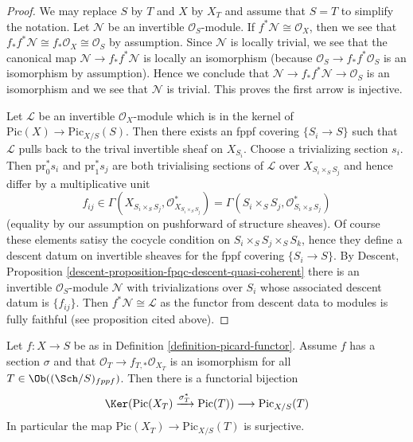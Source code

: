 \begin{proof}
We may replace $S$ by $T$ and $X$ by $X_T$ and assume that $S = T$
to simplify the notation. Let $\mathcal{N}$ be an invertible
$\mathcal{O}_S$-module. If $f^*\mathcal{N} \cong \mathcal{O}_X$, then
we see that $f_*f^*\mathcal{N} \cong f_*\mathcal{O}_X \cong \mathcal{O}_S$
by assumption. Since $\mathcal{N}$ is locally trivial, we see that
the canonical map $\mathcal{N} \to f_*f^*\mathcal{N}$ is locally
an isomorphism (because $\mathcal{O}_S \to f_*f^*\mathcal{O}_S$
is an isomorphism by assumption). Hence we conclude that
$\mathcal{N} \to f_*f^*\mathcal{N} \to \mathcal{O}_S$ is an isomorphism
and we see that $\mathcal{N}$ is trivial. This proves the first arrow
is injective.

\medskip\noindent
Let $\mathcal{L}$ be an invertible $\mathcal{O}_X$-module which is in
the kernel of $\text{Pic}(X) \to \text{Pic}_{X/S}(S)$. Then there exists
an fppf covering $\{S_i \to S\}$ such that $\mathcal{L}$ pulls back
to the trival invertible sheaf on $X_{S_i}$. Choose a trivializing
section $s_i$. Then $\text{pr}_0^*s_i$ and $\text{pr}_1^*s_j$ are both
trivialising sections of $\mathcal{L}$ over $X_{S_i \times_S S_j}$
and hence differ by a multiplicative unit
$$
f_{ij} \in
\Gamma(X_{S_i \times_S S_j}, \mathcal{O}_{X_{S_i \times_S S_j}}^*) =
\Gamma(S_i \times_S S_j, \mathcal{O}_{S_i \times_S S_j}^*)
$$
(equality by our assumption on pushforward of structure sheaves).
Of course these elements satisy the cocycle condition on
$S_i \times_S S_j \times_S S_k$, hence they define a descent datum
on invertible sheaves for the fppf covering $\{S_i \to S\}$.
By Descent, Proposition \ref{descent-proposition-fpqc-descent-quasi-coherent}
there is an invertible $\mathcal{O}_S$-module $\mathcal{N}$
with trivializations over $S_i$ whose associated descent datum is
$\{f_{ij}\}$. Then $f^*\mathcal{N} \cong \mathcal{L}$ as the
functor from descent data to modules is fully faithful (see proposition
cited above).
\end{proof}

\begin{lemma}
\label{lemma-flat-geometrically-connected-fibres-with-section}
Let $f : X \to S$ be as in Definition \ref{definition-picard-functor}.
Assume $f$ has a section $\sigma$ and that
$\mathcal{O}_T \to f_{T, *}\mathcal{O}_{X_T}$ is an isomorphism
for all $T \in \Ob((\Sch/S)_{fppf})$. Then there is a functorial bijection
$$
\Ker(\text{Pic}(X_T) \xrightarrow{\sigma_T^*} \text{Pic}(T)) 
\longrightarrow
\text{Pic}_{X/S}(T)
$$
In particular the map $\text{Pic}(X_T) \to \text{Pic}_{X/S}(T)$ is surjective.
\end{lemma}

